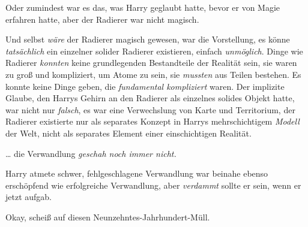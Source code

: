 Oder zumindest war es das, was Harry geglaubt hatte, bevor er von Magie erfahren hatte, aber der Radierer war nicht magisch.

Und selbst \emph{wäre} der Radierer magisch gewesen, war die Vorstellung, es könne \emph{tatsächlich} ein einzelner solider Radierer existieren, einfach \emph{unmöglich}. Dinge wie Radierer \emph{konnten} keine grundlegenden Bestandteile der Realität sein, sie waren zu groß und kompliziert, um Atome zu sein, sie \emph{mussten} aus Teilen bestehen. Es konnte keine Dinge geben, die \emph{fundamental kompliziert} waren. Der implizite Glaube, den Harrys Gehirn an den Radierer als einzelnes solides Objekt hatte, war nicht nur \emph{falsch}, es war eine Verwechslung von Karte und Territorium, der Radierer existierte nur als separates Konzept in Harrys mehrschichtigem \emph{Modell} der Welt, nicht als separates Element einer einschichtigen Realität.

… die Verwandlung \emph{geschah noch immer nicht.}

Harry atmete schwer, fehlgeschlagene Verwandlung war beinahe ebenso erschöpfend wie erfolgreiche Verwandlung, aber \emph{verdammt} sollte er sein, wenn er jetzt aufgab.

Okay, scheiß auf diesen Neunzehntes-Jahrhundert-Müll.

